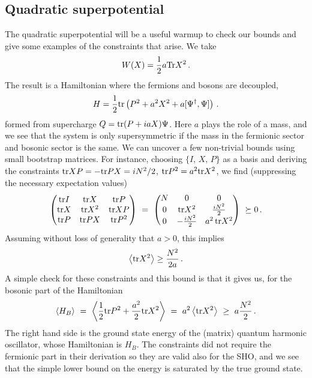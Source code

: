 \documentclass[a4paper,11pt]{article}
\newcommand{\tr}{{\rm {tr}}}
\newcommand{\Tr}{{\rm {Tr}}}
\numberwithin{equation}{section}
\begin{document}
\subsection{Quadratic superpotential}

The quadratic superpotential will be a useful warmup to check our bounds and give some examples of the constraints that arise. We take
\begin{align}
    W(X) = \frac{1}{2} a \Tr X^2 \,.
\end{align}%
%
The result is a Hamiltonian where the fermions and bosons are decoupled,
%
\begin{align}
    H = \frac{1}{2} \tr \left( P^2 +  a^2  X^2 +  a [\Psi^\dagger, \Psi] \right) \, .
\end{align}
%
formed from supercharge $Q = \tr (P + i a X) \Psi$. Here $a$ plays the role of a mass, and we see that the system is only supersymmetric if the mass in the fermionic sector and bosonic sector is the same. We can uncover a few non-trivial bounds using small bootstrap matrices. For instance, choosing $ \{ I, \, X, \, P \}$ as a basis and deriving the constraints $\tr XP = -\tr PX = i N^2 / 2$, $\tr P^2 = a^2 \tr X^2$, we find (suppressing the necessary expectation values)
%
\begin{align}
    \begin{pmatrix}
        \tr I  & \tr X & \tr P \\
        \tr X & \tr X^2 & \tr XP \\
        \tr P & \tr PX & \tr P^2 
    \end{pmatrix} \ = \ 
    \begin{pmatrix}
        N  & 0 & 0 \\
        0 & \tr X^2 & \frac{i N^2}{2} \\
        0 & -\frac{i N^2}{2} & a^2 \, \tr X^2
    \end{pmatrix} \ \succeq 0 \, .
\end{align}
%
Assuming without loss of generality that $a > 0$, this implies 
%
\begin{align}
     \left< \tr X^2 \right>  \geq \frac{N^2}{2 a} \,.
\end{align}
%
A simple check for these constraints and this bound is that it gives us, for the bosonic part of the Hamiltonian
%
\begin{align}
   \langle H_B \rangle  \ = \ \left< \frac{1}{2} \tr P^2 + \frac{a^2}{2} \tr X^2 \right> \ = \ a^2 \left< \tr X^2 \right> \ \geq \ a \frac{N^2}{2} \, .
\end{align}
%
The right hand side is the ground state energy of the (matrix) quantum harmonic oscillator, whose Hamiltonian is $H_B$. The constraints did not require the fermionic part in their derivation so they are valid also for the SHO, and we see that the simple lower bound on the energy is saturated by the true ground state. 
\end{document}
